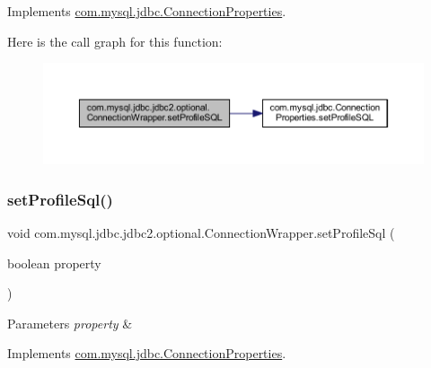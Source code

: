 Implements \mbox{\hyperlink{interfacecom_1_1mysql_1_1jdbc_1_1_connection_properties_a6c91e5a3250a313eee67f7174599be99}{com.\+mysql.\+jdbc.\+Connection\+Properties}}.

Here is the call graph for this function\+:
\nopagebreak
\begin{figure}[H]
\begin{center}
\leavevmode
\includegraphics[width=350pt]{classcom_1_1mysql_1_1jdbc_1_1jdbc2_1_1optional_1_1_connection_wrapper_a930d83fb622c7a5e5ac1694599e7b696_cgraph}
\end{center}
\end{figure}
\mbox{\label{classcom_1_1mysql_1_1jdbc_1_1jdbc2_1_1optional_1_1_connection_wrapper_afe33bc3a8bc2ecba4e453c1bcb3d5d2d}} 
\subsubsection{\texorpdfstring{set\+Profile\+Sql()}{setProfileSql()}}
{\footnotesize\ttfamily void com.\+mysql.\+jdbc.\+jdbc2.\+optional.\+Connection\+Wrapper.\+set\+Profile\+Sql (\begin{DoxyParamCaption}\item[{boolean}]{property }\end{DoxyParamCaption})}


\begin{DoxyParams}{Parameters}
{\em property} & \\
\hline
\end{DoxyParams}


Implements \mbox{\hyperlink{interfacecom_1_1mysql_1_1jdbc_1_1_connection_properties_a6e32297fa42ce676613c35580365416a}{com.\+mysql.\+jdbc.\+Connection\+Properties}}.

